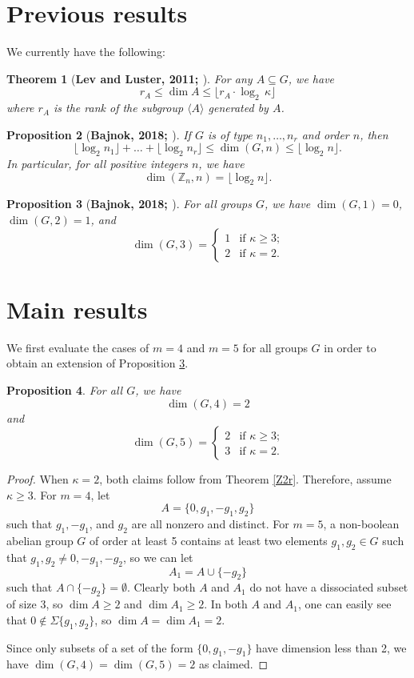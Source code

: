 \documentclass[11pt]{article}
\newcommand{\Z}{\mathbb{Z}}
\newtheorem{thm}{Theorem}
\newtheorem{prop}[thm]{Proposition}
\begin{document}
\section{Previous results}
We currently have the following:
\begin{thm}[\bf Lev and Luster, 2011; \cite{lev}]\label{F.188}
For any $A\subseteq G$, we have
    \[r_A\leq \dim A\leq \lfloor r_A\cdot\log_2\,\kappa\rfloor\]
    where $r_A$ is the rank of the subgroup $\langle A\rangle$ generated by $A$.
\end{thm}
\begin{prop}[\bf Bajnok, 2018; \cite{bb}]\label{nr}
If $G$ is of type $n_1,\ldots,n_r$ and order $n$, then
\[\lfloor\log_2 n_1\rfloor+\ldots+\lfloor\log_2 n_r\rfloor\leq\dim(G,n)\leq\lfloor\log_2 n\rfloor.\]
In particular, for all positive integers $n$, we have
\[\dim(\Z_n,n)=\lfloor\log_2 n\rfloor.\]
\end{prop}

\begin{prop}[\bf Bajnok, 2018; \cite{bb}]\label{123}
For all groups $G$, we have $\dim(G, 1)=0$, $\dim(G, 2)=1$, and
\[\dim(G, 3) = \begin{cases}1 & \text{if $\kappa\geq3$;} \\ 2 & \text{if $\kappa=2$.}\end{cases}\]
\end{prop}

\section{Main results}

We first evaluate the cases of $m=4$ and $m=5$ for all groups $G$ in order to obtain an extension of Proposition \ref{123}.
\begin{prop}\label{45}
For all $G$, we have
\[\dim(G,4)=2\]
and
\[\dim(G,5)=\begin{cases}
2 & \text{if $\kappa\geq3$;}\\
3 & \text{if $\kappa=2$.}
\end{cases}\]
\end{prop}
\begin{proof}
When $\kappa=2$, both claims follow from Theorem \ref{Z2r}. Therefore, assume $\kappa\geq3$. 
For $m=4$, let
\[A = \{0, g_1, -g_1, g_2\}\]
such that $g_1, -g_1$, and $g_2$ are all nonzero and distinct. For $m=5$, a non-boolean abelian group $G$ of order at least 5 contains at least two elements $g_1,g_2\in G$ such that $g_1,g_2\neq 0,-g_1,-g_2$, so we can let
\[A_1= A\cup\{-g_2\}\]
such that $A\cap\{-g_2\}=\emptyset$. Clearly both $A$ and $A_1$ do not have a dissociated subset of size 3, so $\dim A\geq 2$ and $\dim A_1\geq 2$. In both $A$ and $A_1$, one can easily see that $0\notin\Sigma\{g_1,g_2\}$, so $\dim A =\dim A_1=2$. 

Since only subsets of a set of the form $\{0,g_1,-g_1\}$ have dimension less than 2, we have $\dim(G,4)=\dim(G,5)=2$ as claimed.
\end{proof}
\end{document}
